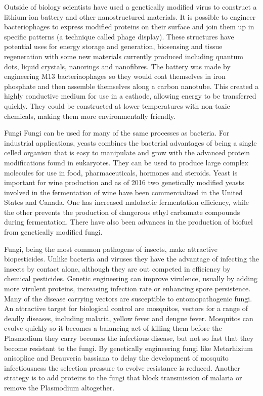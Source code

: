 Outside of biology scientists have used a genetically modified virus to construct a lithium-ion battery and other nanostructured materials. It is possible to engineer bacteriophages to express modified proteins on their surface and join them up in specific patterns (a technique called phage display). These structures have potential uses for energy storage and generation, biosensing and tissue regeneration with some new materials currently produced including quantum dots, liquid crystals, nanorings and nanofibres. The battery was made by engineering M13 bacteriaophages so they would coat themselves in iron phosphate and then assemble themselves along a carbon nanotube. This created a highly conductive medium for use in a cathode, allowing energy to be transferred quickly. They could be constructed at lower temperatures with non-toxic chemicals, making them more environmentally friendly.

Fungi
Fungi can be used for many of the same processes as bacteria. For industrial applications, yeasts combines the bacterial advantages of being a single celled organism that is easy to manipulate and grow with the advanced protein modifications found in eukaryotes. They can be used to produce large complex molecules for use in food, pharmaceuticals, hormones and steroids. Yeast is important for wine production and as of 2016 two genetically modified yeasts involved in the fermentation of wine have been commercialized in the United States and Canada. One has increased malolactic fermentation efficiency, while the other prevents the production of dangerous ethyl carbamate compounds during fermentation. There have also been advances in the production of biofuel from genetically modified fungi.

Fungi, being the most common pathogens of insects, make attractive biopesticides. Unlike bacteria and viruses they have the advantage of infecting the insects by contact alone, although they are out competed in efficiency by chemical pesticides. Genetic engineering can improve virulence, usually by adding more virulent proteins, increasing infection rate or enhancing spore persistence. Many of the disease carrying vectors are susceptible to entomopathogenic fungi. An attractive target for biological control are mosquitos, vectors for a range of deadly diseases, including malaria, yellow fever and dengue fever. Mosquitos can evolve quickly so it becomes a balancing act of killing them before the Plasmodium they carry becomes the infectious disease, but not so fast that they become resistant to the fungi. By genetically engineering fungi like Metarhizium anisopliae and Beauveria bassiana to delay the development of mosquito infectiousness the selection pressure to evolve resistance is reduced. Another strategy is to add proteins to the fungi that block transmission of malaria or remove the Plasmodium altogether.

